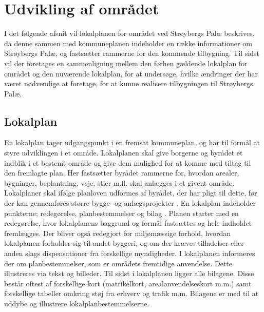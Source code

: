 \chapter{Udvikling af området}
I det følgende afsnit vil lokalplanen for området ved Strøybergs Palæ beskrives, da denne sammen med kommuneplanen indeholder en række informationer om Strøybergs Palæ, og fastsætter rammerne for den kommende tilbygning. 
\newline \indent{     }   Til sidst vil der foretages en sammenligning mellem den førhen gældende lokalplan for området og den nuværende lokalplan, for at undersøge, hvilke ændringer der har været nødvendige at foretage, for at kunne realisere tilbygningen til Strøybergs Palæ.

\section{Lokalplan}
En lokalplan tager udgangspunkt i en fremsat kommuneplan, og har til formål at styre udviklingen i et område. Lokalplanen skal give borgerne og byrådet et indblik i et bestemt område og give dem mulighed for at komme med tiltag til den fremlagte plan. Her fastsætter byrådet rammerne for, hvordan arealer, bygninger, beplantning, veje, stier m.fl. skal anlægges i et givent område. Lokalplaner skal ifølge planloven udformes af byrådet, der har pligt til dette, før der kan gennemføres større bygge- og anlægsprojekter \citep[ s. 4]{lokalplan}.
\newline
\newline
En lokalplan indeholder punkterne; redegørelse, planbestemmelser og bilag \citep[ s. 4]{lokalplan}.
\newline \indent{     }  Planen starter med en redegørelse, hvor lokalplanens baggrund og formål fastsættes og hele indholdet fremlægges. Der bliver også redegjort for miljømæssige forhold, hvordan lokalplanen forholder sig til andet byggeri, og om der kræves tilladelser eller anden slags dispensationer fra forskellige myndigheder.  
\newline \indent{     }   I lokalplanen informeres der om planbestemmelser, som er områdets fremtidige anvendelse. Dette illustreres via tekst og billeder.
\newline \indent{     }  Til sidst i lokalplanen ligger alle bilagene. Disse består oftest af forskellige kort (matrikelkort, arealanvendelseskort m.m.) samt forskellige tabeller omkring støj fra erhverv og trafik m.m. Bilagene er med til at uddybe og illustrere lokalplanbestemmelserne.
\newline
